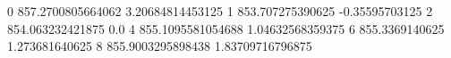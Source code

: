 0 857.2700805664062 3.20684814453125
1 853.707275390625 -0.35595703125
2 854.063232421875 0.0
4 855.1095581054688 1.04632568359375
6 855.3369140625 1.273681640625
8 855.9003295898438 1.83709716796875
